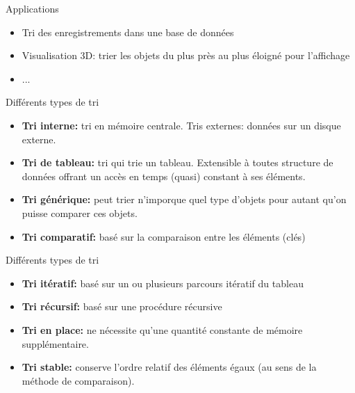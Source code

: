 \begin{frame}{Applications}
\begin{itemize}
\item Tri des enregistrements dans une base de données
\item Visualisation 3D: trier les objets du plus près au plus éloigné pour l'affichage
\item ...
\end{itemize}
\end{frame}

\begin{frame}{Différents types de tri}

\begin{itemize}
\item {\bf Tri interne:} tri en mémoire centrale. Tris externes: données sur un disque externe.
\item {\bf Tri de tableau:} tri qui trie un tableau. Extensible à toutes structure de données offrant un accès en temps (quasi) constant à ses éléments.
\item {\bf Tri générique:} peut trier n'imporque quel type d'objets pour autant qu'on puisse comparer ces objets.
\item {\bf Tri comparatif:} basé sur la comparaison entre les éléments (clés)

\end{itemize}

\end{frame}

\begin{frame}{Différents types de tri}
\begin{itemize}
\item {\bf Tri itératif:} basé sur un ou plusieurs parcours itératif du tableau
\item {\bf Tri récursif:} basé sur une procédure récursive
\item {\bf Tri en place:} ne nécessite qu'une quantité constante de mémoire supplémentaire.
\item {\bf Tri  stable:} conserve l'ordre relatif des éléments égaux (au sens de la méthode de comparaison).
\end{itemize}

\end{frame}

